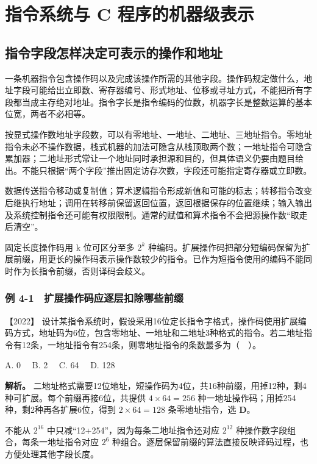 \section{指令系统与 C 程序的机器级表示}\label{co-ch4}

\subsection{指令字段怎样决定可表示的操作和地址}\label{co-04-01}

一条机器指令包含操作码以及完成该操作所需的其他字段。操作码规定做什么，地址字段可能给出立即数、寄存器编号、形式地址、位移或寻址方式，不能把所有字段都当成主存绝对地址。指令字长是指令编码的位数，机器字长是整数运算的基本位宽，两者不必相等。

按显式操作数地址字段数，可以有零地址、一地址、二地址、三地址指令。零地址指令未必不操作数据，栈式机器的加法可隐含从栈顶取两个数；一地址指令可隐含累加器；二地址形式常让一个地址同时承担源和目的，但具体语义仍要由题目给出。不能只根据``两个字段''推出固定访存次数，字段还可能指定寄存器或立即数。

数据传送指令移动或复制值；算术逻辑指令形成新值和可能的标志；转移指令改变后继执行地址；调用在转移前保留返回位置，返回根据保存的位置继续；输入输出及系统控制指令还可能有权限限制。通常的赋值和算术指令不会把源操作数``取走后清空''。

固定长度操作码用 k 位可区分至多 \(2^k\) 种编码。扩展操作码把部分短编码保留为扩展前缀，用更长的操作码表示操作数较少的指令。已作为短指令使用的编码不能同时作为长指令前缀，否则译码会歧义。

\subsubsection{例 4-1　扩展操作码应逐层扣除哪些前缀}\label{co-ex4-1}

\noindent{}【2022】 设计某指令系统时，假设采用16位定长指令字格式，操作码使用扩展编码方式，地址码为6位，包含零地址、一地址和二地址3种格式的指令。若二地址指令有12条，一地址指令有254条，则零地址指令的条数最多为（　）。

A. 0　 B. 2　 C. 64　 D. 128


\textbf{解析。} 二地址格式需要12位地址，短操作码为4位，共16种前缀，用掉12种，剩4种可扩展。每个前缀再接6位，共提供 \(4\times64=256\) 种一地址操作码；用掉254种，剩2种再各扩展6位，得到 \(2\times64=128\) 条零地址指令，选 \textbf{D}。

不能从 \(2^{16}\) 中只减``12+254''，因为每条二地址指令还对应 \(2^{12}\) 种操作数字段组合，每条一地址指令对应 \(2^6\) 种组合。逐层保留前缀的算法直接反映译码过程，也方便处理其他字段长度。

